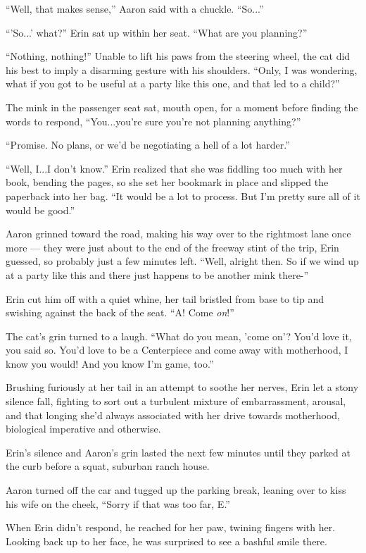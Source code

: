 \documentclass[12pt,letterpaper,oneside]{memoir}
\begin{document}
  ``Well, that makes sense,'' Aaron said with a chuckle. ``So...''

  ``'So...' what?'' Erin sat up within her seat. ``What are you planning?''

  ``Nothing, nothing!'' Unable to lift his paws from the steering wheel, the cat did his best to imply a disarming gesture with his shoulders. ``Only, I was wondering, what if you got to be useful at a party like this one, and that led to a child?''

  The mink in the passenger seat sat, mouth open, for a moment before finding the words to respond, ``You...you're sure you're not planning anything?''

  ``Promise. No plans, or we'd be negotiating a hell of a lot harder.''

  ``Well, I...I don't know.'' Erin realized that she was fiddling too much with her book, bending the pages, so she set her bookmark in place and slipped the paperback into her bag. ``It would be a lot to process. But I'm pretty sure all of it would be good.''

  Aaron grinned toward the road, making his way over to the rightmost lane once more --- they were just about to the end of the freeway stint of the trip, Erin guessed, so probably just a few minutes left. ``Well, alright then. So if we wind up at a party like this and there just happens to be another mink there-''

  Erin cut him off with a quiet whine, her tail bristled from base to tip and swishing against the back of the seat. ``A! Come \textit{on}!''

  The cat's grin turned to a laugh. ``What do you mean, 'come on'? You'd love it, you said so. You'd love to be a Centerpiece and come away with motherhood, I know you would! And you know I'm game, too.''

  Brushing furiously at her tail in an attempt to soothe her nerves, Erin let a stony silence fall, fighting to sort out a turbulent mixture of embarrassment, arousal, and that longing she'd always associated with her drive towards motherhood, biological imperative and otherwise.

  Erin's silence and Aaron's grin lasted the next few minutes until they parked at the curb before a squat, suburban ranch house.

  Aaron turned off the car and tugged up the parking break, leaning over to kiss his wife on the cheek, ``Sorry if that was too far, E.''

  When Erin didn't respond, he reached for her paw, twining fingers with her. Looking back up to her face, he was surprised to see a bashful smile there.
\end{document}
